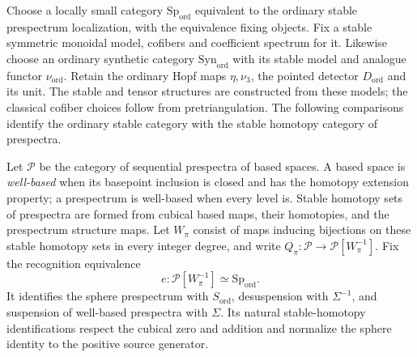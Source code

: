 \begin{definition}
\label{sem:AdamsSynthetic:ordinary-models}
\label{sem:AdamsSynthetic:ordinary-source-recognition}
Choose a locally small category $\mathrm{Sp}_{\mathrm{ord}}$ equivalent to the ordinary stable prespectrum localization, with the equivalence fixing objects. Fix a stable symmetric monoidal model, cofibers and coefficient spectrum for it. Likewise choose an ordinary synthetic category $\mathrm{Syn}_{\mathrm{ord}}$ with its stable model and analogue functor $\nu_{\mathrm{ord}}$. Retain the ordinary Hopf maps $\eta,\nu_3$, the pointed detector $D_{\mathrm{ord}}$ and its unit. The stable and tensor structures are constructed from these models; the classical cofiber choices follow from pretriangulation.
The following comparisons identify the ordinary stable category with
the stable homotopy category of prespectra.\par
Let $\mathcal P$ be the category of sequential prespectra of
based spaces. A based space is \emph{well-based} when its basepoint
inclusion is closed and has the homotopy extension property; a
prespectrum is well-based when every level is. Stable homotopy sets
of prespectra are formed from cubical based maps, their homotopies, and
the prespectrum structure maps.
Let $W_\pi$ consist of maps inducing bijections on these stable homotopy
sets in every integer degree, and write
$Q_\pi\colon\mathcal P\to\mathcal P[W_\pi^{-1}]$.
Fix the recognition equivalence
\[
 e\colon\mathcal P[W_\pi^{-1}]\simeq\mathrm{Sp}_{\mathrm{ord}}.
\]
It identifies the sphere prespectrum with $S_{\mathrm{ord}}$,
desuspension with $\Sigma^{-1}$,
and suspension of well-based prespectra with $\Sigma$.
Its natural stable-homotopy identifications respect the cubical
zero and addition and normalize the sphere identity to the positive
source generator.


\end{definition}
